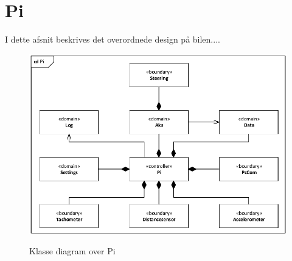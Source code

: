 \section{Pi}

I dette afsnit beskrives det overordnede design på bilen.... %

\begin{figure}[h]
\centering
\includegraphics[width=\textwidth* 9/10]{../fig/diagrammer/bil/cd_pi.pdf}
\label{fig:cd_pi}
\caption{Klasse diagram over Pi}
\end{figure}

